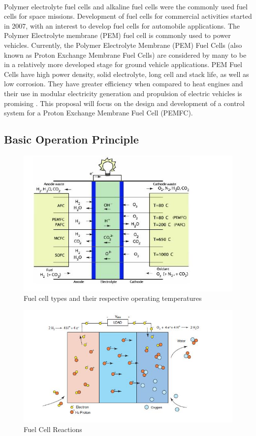 \paragraph{}Polymer electrolyte fuel cells and alkaline fuel cells were the commonly used fuel cells for space missions. Development of fuel cells for commercial activities started in 2007, with an interest to develop fuel cells for automobile applications. The Polymer Electrolyte membrane (PEM) fuel cell is commonly used to power vehicles. Currently, the Polymer Electrolyte Membrane (PEM) Fuel Cells (also known as Proton Exchange Membrane Fuel Cells) are considered by many to be in a relatively more developed stage for ground vehicle applications. PEM Fuel Cells have high power density, solid electrolyte, long cell and stack life, as well as low corrosion. They have greater eﬃciency when compared to heat engines and their use in modular electricity generation and propulsion of electric vehicles is promising \cite{holze_supramanian_2007}. This proposal will focus on the design and development of a control system for a Proton Exchange Membrane Fuel Cell (PEMFC).

\subsection{Basic Operation Principle }
\begin{figure}[!h]
\includegraphics{Figures/Figure1}
\caption{Fuel cell types and their respective operating temperatures
\cite{stefanopoulou_mechatronics_nodate}}
\end{figure}
\begin{figure}[!h]
\includegraphics{Figures/Figure2}
\caption{Fuel Cell Reactions
\cite{pukrushpan_modeling_2003}}
\end{figure}
